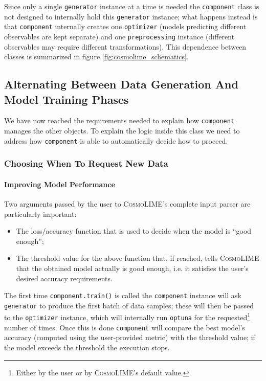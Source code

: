 Since only a single \texttt{generator} instance at a time is needed the \texttt{component} class is not designed to internally hold this \texttt{generator} instance; what happens instead is that \texttt{component} internally creates one \texttt{optimizer} (models predicting different observables are kept separate) and one \texttt{preprocessing} instance (different observables may require different transformations). This dependence between classes is summarized in figure \ref{fig:cosmolime_schematics}.

\subsection{Alternating Between Data Generation And Model Training Phases}\label{subsec:alternating_data_generation_training}
We have now reached the requirements needed to explain how \texttt{component} manages the other objects. To explain the logic inside this class we need to address how \texttt{component} is able to automatically decide how to proceed.

\subsubsection{Choosing When To Request New Data}
\paragraph{Improving Model Performance}
Two arguments passed by the user to \textsc{CosmoLIME}'s complete input parser are particularly important:
\begin{itemize}
    \item The loss/accuracy function that is used to decide when the model is ``good enough'';
    \item The threshold value for the above function that, if reached, tells \textsc{CosmoLIME} that the obtained model actually is good enough, i.e. it satisfies the user's desired accuracy requirements.
\end{itemize}
The first time \texttt{component.train()} is called the \texttt{component} instance will ask \texttt{generator} to produce the first batch of data samples; these will then be passed to the \texttt{optimizer} instance, which will internally run \texttt{optuna} for the requested\footnote{Either by the user or by \textsc{CosmoLIME}'s default value.} number of times. Once this is done \texttt{component} will compare the best model's accuracy (computed using the user-provided metric) with the threshold value; if the model exceeds the threshold the execution stops. 

